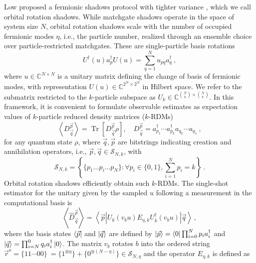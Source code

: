 \documentclass[../main.tex]{subfiles}
\begin{document}
Low proposed a fermionic shadows protocol with tighter variance \cite{low2022classical}, which we call orbital rotation shadows. While matchgate shadows operate in the space of system size $N$, orbital rotation shadows scale with the number of occupied fermionic modes $\eta$, i.e., the particle number,  realized through an ensemble choice over particle-restricted matchgates. These are single-particle basis rotations
\begin{equation}
 U^\dagger(u) a_p^{\dagger} U(u)=\sum_{q=1}^{N}u_{pq}a_q^{\dagger}~,
\end{equation}
where $u \in \mathbb{C}^{N \times N}$ is a unitary matrix defining the change of basis of fermionic modes, with representation $U(u) \in \mathbb{C}^{2^N \times 2^N}$ in Hilbert space. We refer to the submatrix restricted to the $k$-particle subspace as  $U_k \in \mathbb{C}^{\binom{N}{k}\times \binom{N}{k}}$.
In this framework, it is convenient to formulate observable estimates as expectation values of $k$-particle reduced density matrices ($k$-RDMs)
\begin{equation}
\left\langle D_{\vec{q}}^{\vec{p}}\right\rangle=\operatorname{Tr}\left[D_{\vec{q}}^{\vec{p}} \rho\right], \quad D_{\vec{q}}^{\vec{p}} = a_{p_1}^{\dagger} \cdots  a_{p_k}^{\dagger} a_{q_k} \cdots  a_{q_1} ~,
\end{equation} for any quantum state $\rho$, where $\vec{q}, \vec{p}$ are bitstrings indicating creation and annihilation operators, i.e., $\vec{p}, \vec{q} \in \mathcal{S}_{N, k}$, with
\begin{equation}
\mathcal{S}_{N, k} = \left\{ \{p_1 \ldots p_i \ldots p_N\}:\forall p_i \in \{0,1\} , \sum_{i=1}^N p_i=k\right\} ~. 
\end{equation}
Orbital rotation shadows efficiently obtain such $k$-RDMs. The single-shot estimator for the unitary given by the sampled $u$ following a measurement in the computational basis is \cite{low2019hamiltonian}
\begin{equation}
\label{eq:lowsingleshotestimator}
\left\langle\hat{D}_{\vec{q}}^{\vec{p}}\right\rangle=\left\langle\vec{p}\left|U_k\left(v_b u\right) E_{\eta, k} U_k^{\dagger}\left(v_b u\right)\right| \vec{q}\right\rangle \, ,
\end{equation}
where the basis states $ \bra{\vec{p}}$ and $\ket{\vec{q}}$ are defined by $\ket{\vec{p}} =  \bra{0} \prod_{i=0}^{N} p_i a_{i}^{\dagger}$ and $\ket{\vec{q}} =  \prod_{i=N}^{0} q_i a_{i}^{\dagger} \ket{0} $.
The matrix $v_b$ rotates $b$ into the ordered string $\vec{r}^o =  \{11\cdots 00\} \:= \{1^{\otimes \eta}\}+ \{0^{\otimes (N-\eta)}\} \in \mathcal{S}_{N, \eta}$ and the operator $E_{\eta, k}$ is defined as
\end{document}
